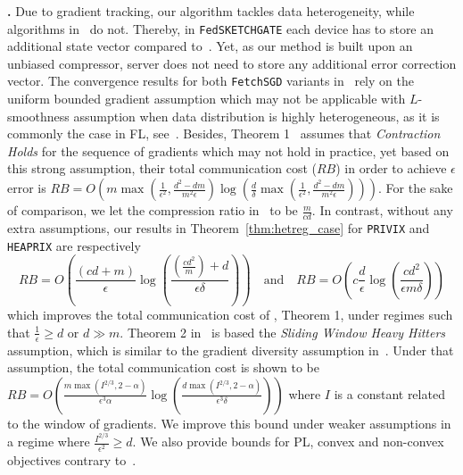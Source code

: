 \documentclass[sigconf, anonymous, review]{acmart}
\begin{document}
\vspace{0.05in}
\noindent\textbf{\citet{rothchild2020fetchsgd}.}
Due to gradient tracking, our algorithm tackles data heterogeneity, while algorithms in~\cite{rothchild2020fetchsgd} do not. 
Thereby, in \texttt{FedSKETCHGATE} each device has to store an additional state vector compared to~\citep{rothchild2020fetchsgd}. 
Yet, as our method is built upon an unbiased compressor, server does not need to store any additional error correction vector.
The convergence results for both \texttt{FetchSGD} variants in~\cite{rothchild2020fetchsgd} rely on the uniform bounded gradient assumption which may not be applicable with $L$-smoothness assumption when data distribution is highly heterogeneous, as it is commonly the case in FL, see~\citep{bayoumi2020tighter}.
Besides, Theorem 1~\citep{rothchild2020fetchsgd} assumes that \emph{Contraction Holds} for the sequence of gradients which may not hold in practice, yet based on this strong assumption, their total communication cost ($RB$) in order to achieve $\epsilon$ error is $RB=O\left(m\max(\frac{1}{\epsilon^2},\frac{d^2-dm}{m^2\epsilon})\log\left(\frac{d}{\delta}\max(\frac{1}{\epsilon^2},\frac{d^2-dm}{m^2\epsilon})\right)\right)$.
For the sake of comparison, we let the compression ratio in~\cite{rothchild2020fetchsgd} to be $\frac{m}{c d}$. 
In contrast, without any extra assumptions, our results in Theorem~\ref{thm:hetreg_case} for \texttt{PRIVIX} and \texttt{HEAPRIX} are respectively $$RB=O(\frac{(cd+m)}{\epsilon}\log(\frac{{(\frac{cd^2}{m})}+d}{\epsilon\delta})) \quad \textrm{and} \quad RB=O(c\frac{d}{\epsilon}\log(\frac{cd^2}{\epsilon m\delta}))$$ which improves the total communication cost of \cite{rothchild2020fetchsgd}, Theorem 1, under regimes such that $\frac{1}{\epsilon}\geq d$ or $d\gg m$. 
Theorem 2 in~\cite{rothchild2020fetchsgd} is based the \emph{Sliding Window Heavy Hitters} assumption, which is similar to the gradient diversity assumption in~\cite{li2018federated,haddadpour2019convergence}. 
Under that assumption, the total communication cost is shown to be $RB=O\left(\frac{m\max(I^{2/3},2-\alpha)}{\epsilon^3\alpha}\log\left(\frac{d\max(I^{2/3},2-\alpha)}{\epsilon^3\delta}\right)\right)$ where $I$ is a constant related to the window of gradients.
We improve this bound under weaker assumptions in a regime where $\frac{I^{2/3}}{\epsilon^2}\geq d$. 
We also provide bounds for PL, convex and non-convex objectives contrary to~\citep{rothchild2020fetchsgd}. 
\end{document}
